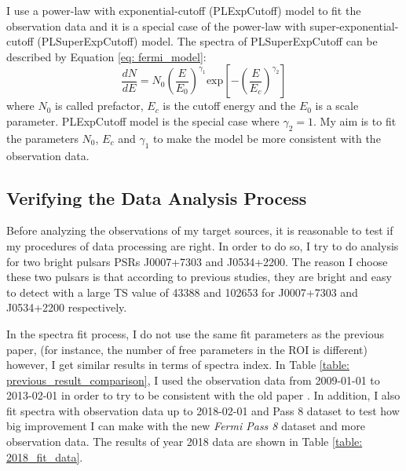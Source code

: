 \documentclass[12pt]{report}
\begin{document}
          I use a power-law with exponential-cutoff (PLExpCutoff) model to fit the 
          observation data and it is a special case of the power-law with 
          super-exponential-cutoff (PLSuperExpCutoff) model. The spectra of PLSuperExpCutoff 
          can be described by Equation \ref{eq: fermi_model}:  
          \begin{equation} 
            \label{eq: fermi_model}
            \frac{dN}{dE} = N_{0} \left(\frac{E}{E_0}\right)^{\gamma_1}\mbox{exp}\left[-\left(\frac{E}{E_c}\right)^{\gamma_2}\right]
          \end{equation}  
          where $N_0$ is called prefactor, $E_c$ is the cutoff energy and the $E_0$ is a scale 
          parameter. PLExpCutoff model is the special case where $\gamma_2=1$. My aim is to 
          fit the parameters $N_0$, $E_c$ and $\gamma_1$ to make the model be more 
          consistent with the observation data.

        \subsection{Verifying the Data Analysis Process}
          Before analyzing the observations of my target sources, it is reasonable to test 
          if my procedures of data processing are right. In order to do so, I try to do 
          analysis for two bright pulsars PSRs J0007+7303 and J0534+2200. The reason I choose 
          these two pulsars is that according to previous studies, they are bright and easy 
          to detect with a large TS value of 43388 and 102653 for J0007+7303 and J0534+2200 
          respectively. \cite{0067-0049-208-2-17} 

          In the spectra fit process, I do not use the same fit parameters as the previous 
          paper, (for instance, the number of free parameters in the ROI is different)
          however, I get similar results in terms of spectra index.  
          In Table \ref{table: previous_result_comparison}, I used the observation data from 
          2009-01-01 to 2013-02-01 in order to try to be consistent with the old paper 
          \cite{0067-0049-208-2-17}. In addition, I also fit spectra with observation data up 
          to 2018-02-01 and Pass 8 dataset to test how big improvement I can make with the 
          new \textit{Fermi Pass 8} dataset and more observation data. 
          The results of year 2018 data are shown in Table \ref{table: 2018_fit_data}.
\end{document}
